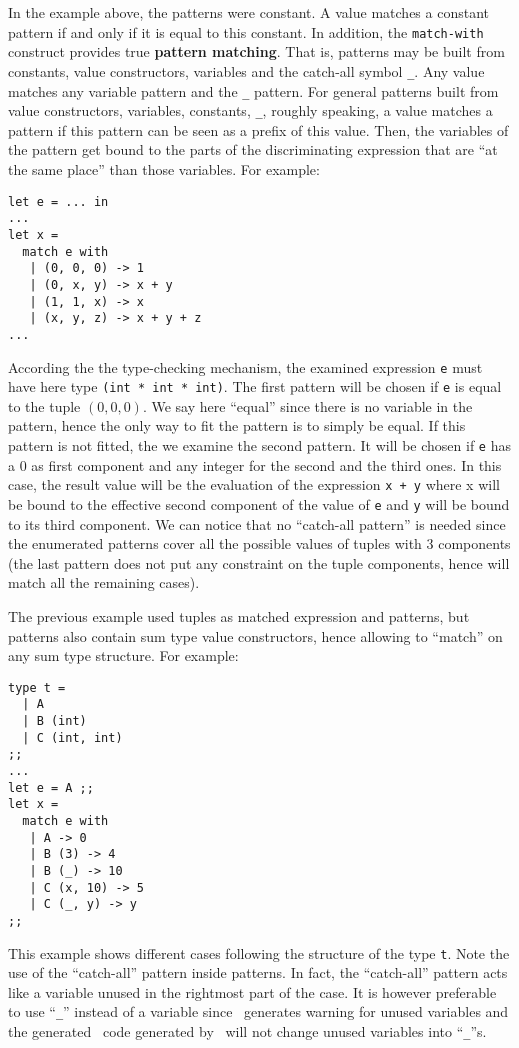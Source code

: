 \medskip In the example above, the patterns were constant. A value
matches a constant pattern if and only if it is equal to this
constant.  In addition, the
{\tt match-with} construct provides true {\bf pattern matching}. That
is, patterns may be built from constants, value constructors,
variables and the catch-all symbol {\tt \_}. Any value matches any
variable pattern and the {\tt \_} pattern. For general patterns built
from value constructors, variables, constants, {\tt \_}, roughly
speaking, a value matches a pattern if this pattern can be seen as a
prefix of this value. Then, the variables of the pattern get bound to
the parts of the discriminating expression that are ``at the same
place'' than those variables. For example:

{\scriptsize
\begin{lstlisting}
let e = ... in
...
let x =
  match e with
   | (0, 0, 0) -> 1
   | (0, x, y) -> x + y
   | (1, 1, x) -> x
   | (x, y, z) -> x + y + z
...
\end{lstlisting}
}
According the the type-checking mechanism, the examined expression
{\tt e} must have here type {\tt (int * int * int)}. The first pattern
will be chosen if {\tt e} is  equal to the tuple $(0, 0, 0)$. We
say here ``equal'' since there is no variable in the pattern, hence
the only way to fit the pattern is to simply  be equal. If this pattern
is not fitted, the we examine the second pattern. It will be chosen if
{\tt e} has a $0$ as first component and any integer for the second
and the third ones. In this case, the result value will be the
evaluation of the expression {\tt x + y} where x will be bound to the
effective second component of the value of {\tt e} and {\tt y} will be
bound to its third component. We can notice that no ``catch-all pattern''
is needed since the enumerated patterns cover all the possible values
of tuples with 3 components (the last pattern does not put
any constraint on the tuple components, hence will match all the
remaining cases).

The previous example used tuples as matched expression and patterns,
but patterns also contain sum type value constructors, hence allowing
to ``match'' on any sum type structure. For example: {\scriptsize
\begin{lstlisting}
type t =
  | A
  | B (int)
  | C (int, int)
;;
...
let e = A ;;
let x =
  match e with
   | A -> 0
   | B (3) -> 4
   | B (_) -> 10
   | C (x, 10) -> 5
   | C (_, y) -> y
;;
\end{lstlisting}
}
This example shows different cases following the structure of the type
{\tt t}. Note the use of the ``catch-all'' pattern
inside  patterns. In fact, the ``catch-all'' pattern acts like
a variable  unused in the rightmost part of the
case. It is however preferable to use ``{\tt \_}'' instead of a
variable since \ocaml\ generates warning for unused variables and the
generated \ocaml\ code generated by \focal\ will not change unused
variables into ``{\tt \_}''s.


